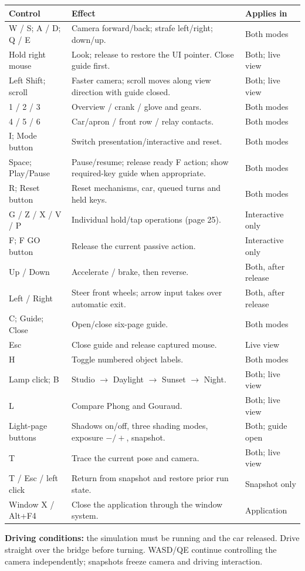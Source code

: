 \documentclass[a4paper,10pt]{article}
\numberwithin{equation}{section}
\begin{document}
{\small
\par\noindent\begin{tabularx}{\linewidth}{@{}p{38mm}Y p{26mm}@{}}
\toprule
\textbf{Control} & \textbf{Effect} & \textbf{Applies in}\\\midrule
W / S; A / D; Q / E & Camera forward/back; strafe left/right; down/up. & Both modes\\
Hold right mouse & Look; release to restore the UI pointer. Close guide first. & Both; live view\\
Left Shift; scroll & Faster camera; scroll moves along view direction with guide closed. & Both; live view\\
1 / 2 / 3 & Overview / crank / glove and gears. & Both modes\\
4 / 5 / 6 & Car/apron / front row / relay contacts. & Both modes\\
I; Mode button & Switch presentation/interactive and reset. & Both modes\\
Space; Play/Pause & Pause/resume; release ready F action; show required-key guide when appropriate. & Both modes\\
R; Reset button & Reset mechanisms, car, queued turns and held keys. & Both modes\\
G / Z / X / V / P & Individual hold/tap operations (page 25). & Interactive only\\
F; F GO button & Release the current passive action. & Interactive only\\
Up / Down & Accelerate / brake, then reverse. & Both, after release\\
Left / Right & Steer front wheels; arrow input takes over automatic exit. & Both, after release\\
C; Guide; Close & Open/close six-page guide. & Both modes\\
Esc & Close guide and release captured mouse. & Live view\\
H & Toggle numbered object labels. & Both modes\\
Lamp click; B & Studio $\rightarrow$ Daylight $\rightarrow$ Sunset $\rightarrow$ Night. & Both; live view\\
L & Compare Phong and Gouraud. & Both; live view\\
Light-page buttons & Shadows on/off, three shading modes, exposure $-/+$, snapshot. & Both; guide open\\
T & Trace the current pose and camera. & Both; live view\\
T / Esc / left click & Return from snapshot and restore prior run state. & Snapshot only\\
Window X / Alt+F4 & Close the application through the window system. & Application\\
\bottomrule
\end{tabularx}\par}
\textbf{Driving conditions:} the simulation must be running and the car released. Drive straight over the bridge before turning. WASD/QE continue controlling the camera independently; snapshots freeze camera and driving interaction.
\end{document}
